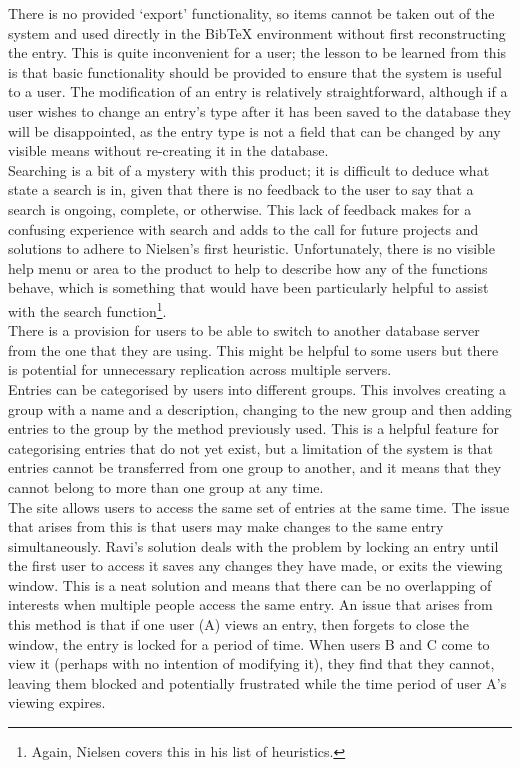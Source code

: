 \documentclass{l4proj}
\newcommand{\BibTeX}{B{\sc ib}\TeX}
\newcommand{\bibtex}{\BibTeX}
\begin{document}
There is no provided `export' functionality, so items cannot be taken out of the system and used directly in the \bibtex{} environment without first reconstructing the entry.  This is quite inconvenient for a user; the lesson to be learned from this is that basic functionality should be provided to ensure that the system is useful to a user.
The modification of an entry is relatively straightforward, although if a user wishes to change an entry's type after it has been saved to the database they will be disappointed, as the entry type is not a field that can be changed by any visible means without re-creating it in the database.\\

Searching is a bit of a mystery with this product; it is difficult to deduce what state a search is in, given that there is no feedback to the user to say that a search is ongoing, complete, or otherwise.  This lack of feedback makes  for a confusing experience with search and adds to the call for future projects and solutions to adhere to Nielsen's first heuristic. Unfortunately, there is no visible help menu or area to the product to help to describe how any of the functions behave, which is something that would have been particularly helpful to assist with the search function\footnote{Again, Nielsen covers this in his list of heuristics.}. \\

There is a provision for users to be able to switch to another database server from the one that they are using.  This might be helpful to some users but there is potential for unnecessary replication across multiple servers.  \\
Entries can be categorised by users into different groups.  This involves creating a group with a name and a description, changing to the new group and then adding entries to the group by the method previously used.  This is a helpful feature for categorising entries that do not yet exist, but a limitation of the system is that entries cannot be transferred from one group to another, and it means that they cannot belong to more than one group at any time.\\

The site allows users to access the same set of entries at the same time.  The issue that arises from this is that users may make changes to the same entry simultaneously.  Ravi's solution deals with the problem by locking an entry until the first user to access it saves any changes they have made, or exits the viewing window.  This is a neat solution and means that there can be no overlapping of interests when multiple people access the same entry.  An issue that arises from this method is that if one user (A) views an entry, then forgets to close the window, the entry is locked for a period of time.  When users B and C come to view it (perhaps with no intention of modifying it), they find that they cannot, leaving them blocked and potentially frustrated while the time period of user A's viewing expires.\\
\end{document}
